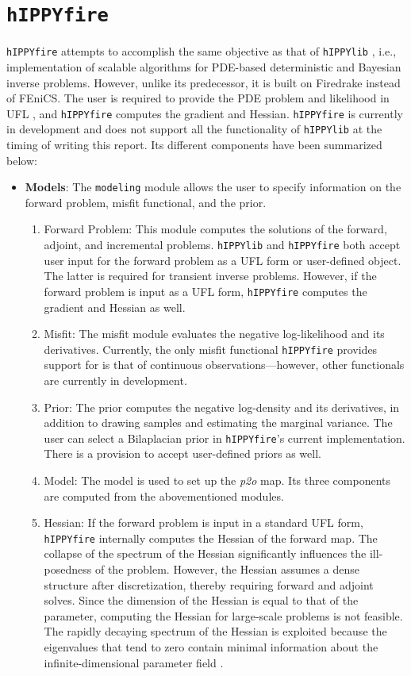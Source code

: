 \section{ \texttt{hIPPYfire} }
\label{section:hIPPYfire}
\texttt{hIPPYfire} attempts to accomplish the same objective as that of \texttt{hIPPYlib} , i.e., implementation of scalable algorithms for PDE-based deterministic and Bayesian inverse problems. However, unlike its predecessor, it is built on Firedrake instead of FEniCS. The user is required to provide the PDE problem and likelihood in UFL \cite{alnaes2014unified}, and \texttt{hIPPYfire} computes the gradient and Hessian. \texttt{hIPPYfire} is currently in development and does not support all the functionality of \texttt{hIPPYlib} at the timing of writing this report. Its different components have been summarized below:
\begin{itemize}
    \item \textbf{Models}: The \texttt{modeling} module allows the user to specify information on the forward problem, misfit functional, and the prior. 
    \begin{enumerate}
        \item Forward Problem: This module computes the solutions of the forward, adjoint, and incremental problems. \texttt{hIPPYlib} and \texttt{hIPPYfire} both accept user input for the forward problem as a UFL form or user-defined object. The latter is required for transient inverse problems. However, if the forward problem is input as a UFL form, \texttt{hIPPYfire} computes the gradient and Hessian as well.
        \item Misfit: The misfit module evaluates the negative log-likelihood and its derivatives. Currently, the only misfit functional \texttt{hIPPYfire} provides support for is that of continuous observations---however, other functionals are currently in development.
        \item Prior: The prior computes the negative log-density and its derivatives, in addition to drawing samples and estimating the marginal variance. The user can select a Bilaplacian prior in \texttt{hIPPYfire}'s current implementation. There is a provision to accept user-defined priors as well.
        \item Model: The model is used to set up the \textit{p2o} map. Its three components are computed from the abovementioned modules.
        \item Hessian: If the forward problem is input in a standard UFL form, \texttt{hIPPYfire} internally computes the Hessian of the forward map. The collapse of the spectrum of the Hessian significantly influences the ill-posedness of the problem. However, the Hessian assumes a dense structure after discretization, thereby requiring forward and adjoint solves. Since the dimension of the Hessian is equal to that of the parameter, computing the Hessian for large-scale problems is not feasible. The rapidly decaying spectrum of the Hessian is exploited because the eigenvalues that tend to zero contain minimal information about the infinite-dimensional parameter field \cite{flath2011fast, bui2012analysis}.   

\end{enumerate}
\end{itemize}

